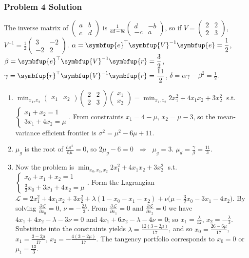 \documentclass[10pt,handout]{beamer}
\newcommand{\ds}{\displaystyle}
\newcommand{\ie}{\;\Longrightarrow\;}
\newcommand{\vV}{\symbfup{V}}
\newcommand{\ve}{\symbfup{e}}
\newcommand{\vr}{\symbfup{r}}
\theoremstyle{definition}
\begin{document}
\begin{frame}[allowframebreaks]
  \frametitle{Problem 4 Solution}
  The inverse matrix of $\ds\begin{pmatrix}a & b \\ c & d\end{pmatrix}$ is $\ds\frac{1}{ad - bc}\begin{pmatrix}d & -b \\ -c & a\end{pmatrix}$, so if $\ds V = \begin{pmatrix}2 & 2 \\ 2 & 3\end{pmatrix}$, $\ds V^{-1} = \frac{1}{2}\begin{pmatrix}3 & -2 \\ -2 & 2\end{pmatrix}$. $\ds\alpha = \ve^\top\vV^{-1}\ve = \frac{1}{2}$, $\ds\beta = \ve^\top\vV^{-1}\vr = \frac{3}{2}$, $\ds\gamma = \vr^\top\vV^{-1}\vr = \frac{11}{2}$, $\ds\delta = \alpha\gamma - \beta^2 = \frac{1}{2}$.
  \begin{enumerate}
    \item $\ds\min_{x_1, x_2}\begin{pmatrix}x_1 & x_2\end{pmatrix}\begin{pmatrix}2 & 2\\ 2 & 3\end{pmatrix}\begin{pmatrix}x_1 \\ x_2\end{pmatrix} = \min_{x_1, x_2} 2x_1^2 + 4x_1 x_2 + 3x_2^2\;$ s.t. $\ds\begin{cases}x_1 + x_2 = 1 \\ 3x_1 + 4 x_2 = \mu\end{cases}$. From constraints $x_1 = 4 - \mu$, $x_2 = \mu - 3$, so the mean-variance efficient frontier is $\sigma^2 = \mu^2 - 6\mu + 11$.  
    \item $\mu_g$ is the root of $\ds\frac{\text{d}\sigma^2}{\text{d}\mu} = 0$, so $2\mu_g - 6 = 0$ $\ie$ $\mu_g = 3$. $\ds\mu_d = \frac{\gamma}{\beta} = \frac{11}{3}$.
    \item Now the problem is $\ds\min_{x_0, x_1, x_2} 2x_1^2 + 4x_1 x_2 + 3x_2^2\;$ s.t. $\ds\begin{cases}x_0 + x_1 + x_2 = 1 \\ \frac{3}{2}x_0 + 3x_1 + 4 x_2 = \mu\end{cases}$. Form the Lagrangian $\ds\mathcal{L} = 2x_1^2 + 4x_1 x_2 + 3x_2^2 + \lambda(1 - x_0 - x_1 - x_2) + \nu\big(\mu - \frac{3}{2}x_0 - 3x_1 - 4 x_2\big)$. By solving $\ds\frac{\partial\mathcal{L}}{\partial x_0} = 0$, $\ds\nu = -\frac{2\lambda}{3}$. From $\ds\frac{\partial\mathcal{L}}{\partial x_1} = 0$ and $\ds\frac{\partial\mathcal{L}}{\partial x_2} = 0$ we have $4x_1 + 4x_2 - \lambda - 3\nu = 0$ and $4x_1 + 6 x_2 - \lambda - 4\nu = 0$; so $\ds x_1 = \frac{\lambda}{12}$, $\ds x_2 = -\frac{\lambda}{3}$. Substitute into the constraints yields $\ds\lambda = \frac{12(3 - 2\mu)}{17}$, and so $\ds x_0 = \frac{26 - 6\mu}{17}$, $\ds x_1 = \frac{3 - 2\mu}{17}$, $\ds x_2 = -\frac{4(3 - 2\mu)}{17}$. The tangency portfolio corresponds to $x_0 = 0$ or $\ds\mu_t = \frac{13}{3}$.

\end{enumerate}
\end{frame}
\end{document}
